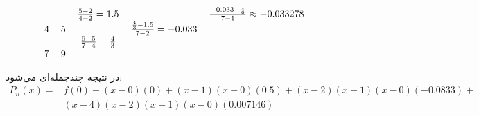 {\begin{enumerate}
\begin{latin}
\begin{align*}
\begin{tabular}{cccccc}
        \\
        & & $\frac{5 - 2}{4 - 2} = 1.5$ & & $\frac{-0.033 - \frac{1}{6}}{7 - 1} \approx -0.033278$ &  \\
        4 & 5 & & $\frac{\frac{4}{3} - 1.5}{7 - 2} = -0.033$ & & 
        \\
        & & $\frac{9 - 5}{7 - 4} = \frac{4}{3}$ & & & \\
        7 & 9 & & & &
    \end{tabular}
\end{align*}
\end{latin}
در نتیجه چندجمله‌ای می‌شود:
\begin{align*}
    P_n(x) = &f(0) + (x - 0)(0) + (x - 1) (x - 0) (0.5) + (x - 2) ( x- 1) ( x- 0) ( -0.0833) + \\ &(x - 4) (x - 2)(x - 1)(x-0)(0.007146)
\end{align*}
\end{enumerate}
}